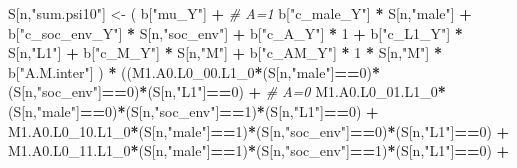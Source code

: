 \documentclass[
]{book}
\newenvironment{Shaded}{\begin{snugshade}}{\end{snugshade}}
\newcommand{\CommentTok}[1]{\textcolor[rgb]{0.56,0.35,0.01}{\textit{#1}}}
\newcommand{\DecValTok}[1]{\textcolor[rgb]{0.00,0.00,0.81}{#1}}
\newcommand{\NormalTok}[1]{#1}
\newcommand{\OtherTok}[1]{\textcolor[rgb]{0.56,0.35,0.01}{#1}}
\newcommand{\SpecialCharTok}[1]{\textcolor[rgb]{0.81,0.36,0.00}{\textbf{#1}}}
\newcommand{\StringTok}[1]{\textcolor[rgb]{0.31,0.60,0.02}{#1}}
\begin{document}
\begin{Shaded}
\begin{Highlighting}[]
\NormalTok{    S[n,}\StringTok{"sum.psi10"}\NormalTok{] }\OtherTok{\textless{}{-}}\NormalTok{  ( b[}\StringTok{"mu\_Y"}\NormalTok{] }\SpecialCharTok{+}                                          \CommentTok{\# A=1}
\NormalTok{                             b[}\StringTok{"c\_male\_Y"}\NormalTok{] }\SpecialCharTok{*}\NormalTok{ S[n,}\StringTok{"male"}\NormalTok{] }\SpecialCharTok{+} 
\NormalTok{                             b[}\StringTok{"c\_soc\_env\_Y"}\NormalTok{] }\SpecialCharTok{*}\NormalTok{ S[n,}\StringTok{"soc\_env"}\NormalTok{] }\SpecialCharTok{+} 
\NormalTok{                             b[}\StringTok{"c\_A\_Y"}\NormalTok{] }\SpecialCharTok{*} \DecValTok{1} \SpecialCharTok{+}
\NormalTok{                             b[}\StringTok{"c\_L1\_Y"}\NormalTok{] }\SpecialCharTok{*}\NormalTok{ S[n,}\StringTok{"L1"}\NormalTok{] }\SpecialCharTok{+}
\NormalTok{                             b[}\StringTok{"c\_M\_Y"}\NormalTok{] }\SpecialCharTok{*}\NormalTok{ S[n,}\StringTok{"M"}\NormalTok{] }\SpecialCharTok{+}
\NormalTok{                             b[}\StringTok{"c\_AM\_Y"}\NormalTok{] }\SpecialCharTok{*} \DecValTok{1} \SpecialCharTok{*}\NormalTok{ S[n,}\StringTok{"M"}\NormalTok{] }\SpecialCharTok{*}\NormalTok{ b[}\StringTok{"A.M.inter"}\NormalTok{] ) }\SpecialCharTok{*}
\NormalTok{      ((M1.A0.L0\_00.L1\_0}\SpecialCharTok{*}\NormalTok{(S[n,}\StringTok{"male"}\NormalTok{]}\SpecialCharTok{==}\DecValTok{0}\NormalTok{)}\SpecialCharTok{*}\NormalTok{(S[n,}\StringTok{"soc\_env"}\NormalTok{]}\SpecialCharTok{==}\DecValTok{0}\NormalTok{)}\SpecialCharTok{*}\NormalTok{(S[n,}\StringTok{"L1"}\NormalTok{]}\SpecialCharTok{==}\DecValTok{0}\NormalTok{) }\SpecialCharTok{+} \CommentTok{\# A\textquotesingle{}=0}
\NormalTok{          M1.A0.L0\_01.L1\_0}\SpecialCharTok{*}\NormalTok{(S[n,}\StringTok{"male"}\NormalTok{]}\SpecialCharTok{==}\DecValTok{0}\NormalTok{)}\SpecialCharTok{*}\NormalTok{(S[n,}\StringTok{"soc\_env"}\NormalTok{]}\SpecialCharTok{==}\DecValTok{1}\NormalTok{)}\SpecialCharTok{*}\NormalTok{(S[n,}\StringTok{"L1"}\NormalTok{]}\SpecialCharTok{==}\DecValTok{0}\NormalTok{) }\SpecialCharTok{+}
\NormalTok{          M1.A0.L0\_10.L1\_0}\SpecialCharTok{*}\NormalTok{(S[n,}\StringTok{"male"}\NormalTok{]}\SpecialCharTok{==}\DecValTok{1}\NormalTok{)}\SpecialCharTok{*}\NormalTok{(S[n,}\StringTok{"soc\_env"}\NormalTok{]}\SpecialCharTok{==}\DecValTok{0}\NormalTok{)}\SpecialCharTok{*}\NormalTok{(S[n,}\StringTok{"L1"}\NormalTok{]}\SpecialCharTok{==}\DecValTok{0}\NormalTok{) }\SpecialCharTok{+} 
\NormalTok{          M1.A0.L0\_11.L1\_0}\SpecialCharTok{*}\NormalTok{(S[n,}\StringTok{"male"}\NormalTok{]}\SpecialCharTok{==}\DecValTok{1}\NormalTok{)}\SpecialCharTok{*}\NormalTok{(S[n,}\StringTok{"soc\_env"}\NormalTok{]}\SpecialCharTok{==}\DecValTok{1}\NormalTok{)}\SpecialCharTok{*}\NormalTok{(S[n,}\StringTok{"L1"}\NormalTok{]}\SpecialCharTok{==}\DecValTok{0}\NormalTok{) }\SpecialCharTok{+}

\end{Highlighting}
\end{Shaded}
\end{document}
